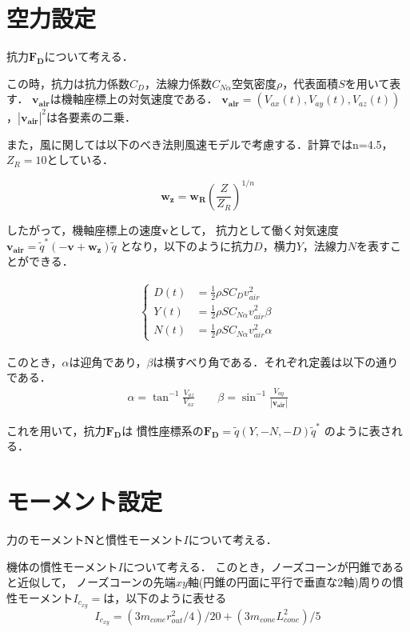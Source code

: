 \documentclass{jsarticle}
\begin{document}
\section{空力設定}
抗力$\bm{F_D}$について考える．

この時，抗力は抗力係数$C_D$，法線力係数$C_{N\alpha}$空気密度$\rho$，代表面積$S$を用いて表す．
$\bm{v_{air}}$は機軸座標上の対気速度である．
$\bm{v_{air}} = (V_{ax}(t), V_{ay}(t), V_{az}(t))$，$|\bm{v_{air}}|^2$は各要素の二乗．

また，風に関しては以下のべき法則風速モデルで考慮する．計算ではn=4.5，$Z_R=10$としている．

\begin{equation}
  \bm{w_z} = \bm{w_R} (\frac{Z}{Z_R})^{1/n}
\end{equation}

したがって，機軸座標上の速度$\bm{v}$として，
抗力として働く対気速度$\bm{v_{air}} = \tilde{q}^*(- \bm{v} + \bm{w_z})\tilde{q}$
となり，以下のように抗力$D$，横力$Y$，法線力$N$を表すことができる．

\begin{eqnarray}
  \begin{cases}
    D(t) &= \frac{1}{2} \rho S C_D v_{air}^2 \\
    Y(t) &= \frac{1}{2} \rho S C_{N\alpha} v_{air}^2 \beta \\
    N(t) &= \frac{1}{2} \rho S C_{N\alpha} v_{air}^2 \alpha
  \end{cases}
\end{eqnarray}

このとき，$\alpha$は迎角であり，$\beta$は横すべり角である．それぞれ定義は以下の通りである．
\begin{eqnarray}
  \alpha = \tan^{-1} \frac{V_{az}}{V_{ax}} \qquad
  \beta = \sin^{-1} \frac{V_{ay}}{|\bm{v_{air}}|}
\end{eqnarray}

これを用いて，抗力$\bm{F_D}$は
慣性座標系の$\bm{F_D} = \tilde{q}(Y, -N, -D)\tilde{q}^*$
のように表される．

\section{モーメント設定}
力のモーメント$\bm{N}$と慣性モーメント$I$について考える．

機体の慣性モーメント$I$について考える．
このとき，ノーズコーンが円錐であると近似して，
ノーズコーンの先端$xy$軸(円錐の円面に平行で垂直な2軸)周りの慣性モーメント$I_c_{xy} = $は，以下のように表せる
\begin{equation}
  I_c_{xy} = (3 m_{cone}r_{out}^2 / 4) / 20 + (3m_{cone}L_{cone}^2) / 5
\end{equation}
\end{document}
